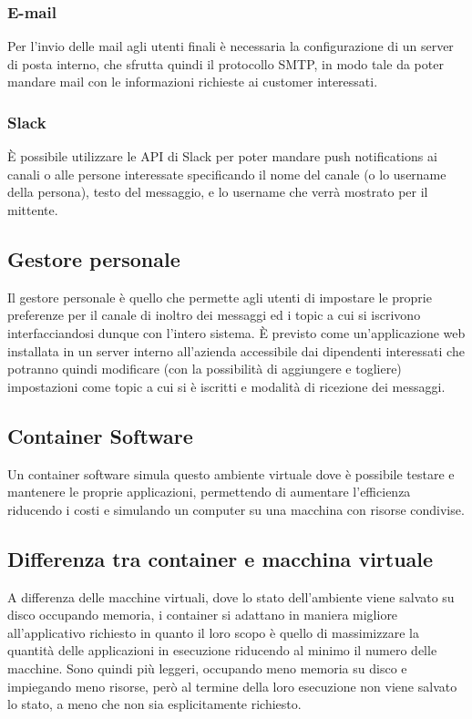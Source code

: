 		\subsubsection{E-mail}
		Per l'invio delle mail agli utenti finali è necessaria la configurazione di un server di posta interno, che sfrutta quindi il protocollo SMTP, in modo tale da poter mandare mail con le informazioni richieste ai customer interessati.
		
		\subsubsection{Slack}
		È possibile utilizzare le API di Slack per poter mandare push notifications ai canali o alle persone interessate specificando il nome del canale (o lo username della persona), testo del messaggio, e lo username che verrà mostrato per il mittente.
	
	\subsection{Gestore personale}
	Il gestore personale è quello che permette agli utenti di impostare le proprie preferenze per il canale di inoltro dei messaggi ed i topic a cui si iscrivono interfacciandosi dunque con l'intero sistema.
	È previsto come un'applicazione web installata in un server interno all'azienda accessibile dai dipendenti interessati che potranno quindi modificare (con la possibilità di aggiungere e togliere) impostazioni come topic a cui si è iscritti e modalità di ricezione dei messaggi.
	
	\subsection{Container Software}
	
		Un container software simula questo ambiente virtuale dove è possibile testare e mantenere le proprie applicazioni, permettendo di aumentare l'efficienza riducendo i costi e simulando un computer su una macchina con risorse condivise.
		
		\subsection{Differenza tra container e macchina virtuale}
		A differenza delle macchine virtuali, dove lo stato dell'ambiente viene salvato su disco occupando memoria, i container si adattano in maniera migliore all'applicativo richiesto in quanto il loro scopo è quello di massimizzare la quantità delle applicazioni in esecuzione riducendo al minimo il numero delle macchine.
		Sono quindi più leggeri, occupando meno memoria su disco e impiegando meno risorse, però al termine della loro esecuzione non viene salvato lo stato, a meno che non sia esplicitamente richiesto.
		
